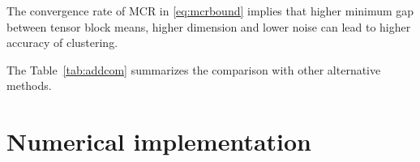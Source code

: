 \documentclass{article}
\newtheorem{theorem}{Theorem}
\begin{document}
The convergence rate of MCR in \eqref{eq:mcrbound} implies that higher minimum gap between tensor block means, higher dimension and lower noise  can lead to higher accuracy of clustering. 

The Table~\ref{tab:addcom} summarizes the comparison with other alternative methods. 
\vspace{-.1cm}
\begin{table}[h!]
	\centering
	\caption{Summary of the comparison among different tensor clustering methods when $d_1=...=d_K=d, R_1=...=R_K=R$.}
	\label{tab:addcom}
\end{table}
\vspace{-.3cm}







\vspace{-.1cm}
\section{Numerical implementation}
\end{document}
